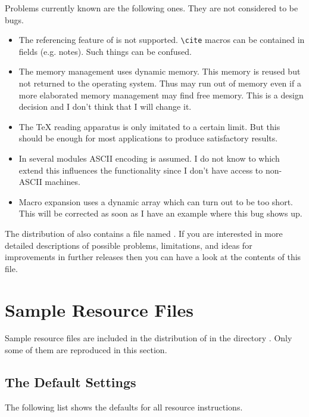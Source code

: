 \documentclass[11pt,a4paper]{scrbook}
\begin{document}
Problems currently known are the following ones. They are not considered to be
bugs.
\begin{itemize}
\item The referencing feature of \BibTeX{} is not supported. \verb|\cite|
  macros can be contained in fields (e.g. notes). Such things can be confused.
\item The memory management uses dynamic memory. This memory is reused but not
  returned to the operating system. Thus \BibTool{} may run out of memory even
  if a more elaborated memory management may find free memory. This is a
  design decision and I don't think that I will change it.
\item The \TeX{} reading apparatus is only imitated to a certain limit. But
  this should be enough for most applications to produce satisfactory results.
\item In several modules ASCII encoding is assumed. I do not know to which
  extend this influences the functionality since I don't have access to
  non-ASCII machines.
\item Macro expansion uses a dynamic array which can turn out to be too
  short. This will be corrected as soon as I have an example where this bug
  shows up. 
\end{itemize}

The distribution of \BibTool{} also contains a file named . If you
are interested in more detailed descriptions of possible problems,
limitations, and ideas for improvements in further releases then you can have
a look at the contents of this file.

\chapter{Sample Resource Files}\label{chap:resource.files}

Sample resource files are included in the distribution of \BibTool{} in the
directory . Only some of them are reproduced in this section.

\section{The Default Settings}

The following list shows the defaults for all resource instructions.
\end{document}
